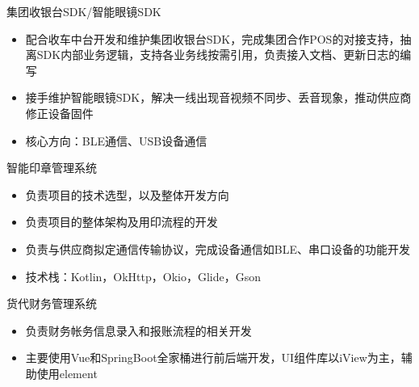 \documentclass{resume}
\begin{document}
集团收银台SDK/智能眼镜SDK
\begin{itemize}
  \item 配合收车中台开发和维护集团收银台SDK，完成集团合作POS的对接支持，抽离SDK内部业务逻辑，支持各业务线按需引用，负责接入文档、更新日志的编写
  \item 接手维护智能眼镜SDK，解决一线出现音视频不同步、丢音现象，推动供应商修正设备固件
  \item 核心方向：BLE通信、USB设备通信
\end{itemize}

智能印章管理系统
\begin{itemize}
  \item 负责项目的技术选型，以及整体开发方向
  \item 负责项目的整体架构及用印流程的开发
  \item 负责与供应商拟定通信传输协议，完成设备通信如BLE、串口设备的功能开发
  \item 技术栈：Kotlin，OkHttp，Okio，Glide，Gson
\end{itemize}

货代财务管理系统
\begin{itemize}
  \item 负责财务帐务信息录入和报账流程的相关开发
  \item 主要使用Vue和SpringBoot全家桶进行前后端开发，UI组件库以iView为主，辅助使用element
\end{itemize}

\end{document}
